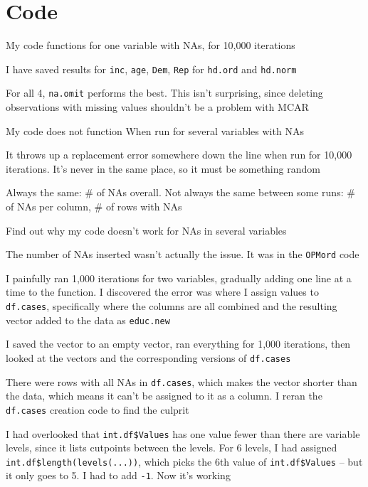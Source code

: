 \section*{Code}
	\begin{coi}
		\item My code functions for one variable with NAs, for 10,000 iterations
			\begin{coi}
				\item I have saved results for \texttt{inc}, \texttt{age}, \texttt{Dem}, \texttt{Rep} for \texttt{hd.ord} and \texttt{hd.norm}
				\item For all 4, \texttt{na.omit} performs the best. This isn't surprising, since deleting observations with missing values shouldn't be a problem with MCAR
			\end{coi}
		\item My code does not function When run for several variables with NAs
			\begin{coi}
				\item It throws up a replacement error somewhere down the line when run for 10,000 iterations. It's never in the same place, so it must be something random
				\item Always the same: \# of NAs overall. Not always the same between some runs: \# of NAs per column, \# of rows with NAs
				\item Find out why my code doesn't work for NAs in several variables
					\begin{coi}
						\item The number of NAs inserted wasn't actually the issue. It was in the \texttt{OPMord} code
						\item I painfully ran 1,000 iterations for two variables, gradually adding one line at a time to the function. I discovered the error was where I assign values to \texttt{df.cases}, specifically where the columns are all combined and the resulting vector added to the data as \texttt{educ.new}
						\item I saved the vector to an empty vector, ran everything for 1,000 iterations, then looked at the vectors and the corresponding versions of \texttt{df.cases}
						\item There were rows with all NAs in \texttt{df.cases}, which makes the vector shorter than the data, which means it can't be assigned to it as a column. I reran the \texttt{df.cases} creation code to find the culprit
						\item I had overlooked that \texttt{int.df\$Values} has one value fewer than there are variable levels, since it lists cutpoints between the levels. For 6 levels, I had assigned \texttt{int.df\$length(levels(...))}, which picks the 6th value of \texttt{int.df\$Values} -- but it only goes to 5. I had to add \texttt{-1}. Now it's working

\end{coi}
\end{coi}
\end{coi}
